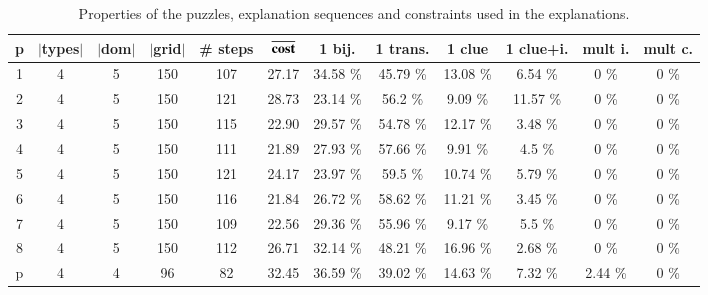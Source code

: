 \begin{table}[t]
	\centering
	\begin{tabular}{c|ccc|cc|cccccc}
		\textbf{p} & \textbf{$|$types$|$} & \textbf{$|$dom$|$} & \textbf{$|$grid$|$} & \textbf{\# steps} & $\overline{\text{\textbf{cost}}}$ & \textbf{1 bij.} & \textbf{1 trans.} & \textbf{1 clue} & \textbf{1 clue+i.} & \textbf{mult i.} & \textbf{mult c.} \\\hline
		1          & 4                    & 5                  & 150                 & 107               & 27.17                             & 34.58 \%        & 45.79 \%          & 13.08 \%         & 6.54 \%             & 0 \%            & 0 \%            \\
		2          & 4                    & 5                  & 150                 & 121               & 28.73                             & 23.14 \%        & 56.2 \%           & 9.09 \%          & 11.57 \%            & 0 \%            & 0 \%            \\
		3          & 4                    & 5                  & 150                 & 115               & 22.90                             & 29.57 \%        & 54.78 \%          & 12.17 \%         & 3.48 \%             & 0 \%            & 0 \%            \\
		4          & 4                    & 5                  & 150                 & 111               & 21.89                             & 27.93 \%        & 57.66 \%          & 9.91 \%          & 4.5 \%              & 0 \%            & 0 \%            \\
		5          & 4                    & 5                  & 150                 & 121               & 24.17                             & 23.97 \%        & 59.5 \%           & 10.74 \%         & 5.79 \%             & 0 \%            & 0 \%            \\
		6          & 4                    & 5                  & 150                 & 116               & 21.84                             & 26.72 \%        & 58.62 \%          & 11.21 \%         & 3.45 \%             & 0 \%            & 0 \%            \\
		7          & 4                    & 5                  & 150                 & 109               & 22.56                             & 29.36 \%        & 55.96 \%          & 9.17 \%          & 5.5 \%              & 0 \%            & 0 \%            \\
		8          & 4                    & 5                  & 150                 & 112               & 26.71                             & 32.14 \%        & 48.21 \%          & 16.96 \%         & 2.68 \%             & 0 \%            & 0 \%            \\
		p          & 4                    & 4                  & 96                  & 82                & 32.45                             & 36.59 \%        & 39.02 \%          & 14.63 \%         & 7.32 \%             & 2.44 \%         & 0 \%
	\end{tabular}
	\caption{Properties of the puzzles, explanation sequences and constraints used in the explanations.}
	\label{table:composition}
\end{table}

